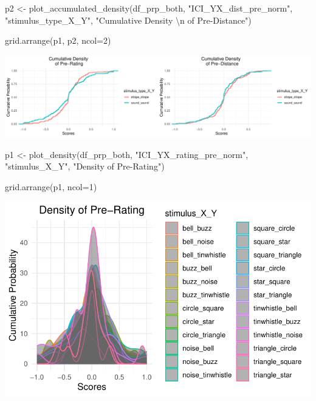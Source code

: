 \documentclass[
  letterpaper,
  DIV=11,
  numbers=noendperiod]{scrartcl}
\newenvironment{Shaded}{\begin{snugshade}}{\end{snugshade}}
\newcommand{\AttributeTok}[1]{\textcolor[rgb]{0.40,0.45,0.13}{#1}}
\newcommand{\DecValTok}[1]{\textcolor[rgb]{0.68,0.00,0.00}{#1}}
\newcommand{\FunctionTok}[1]{\textcolor[rgb]{0.28,0.35,0.67}{#1}}
\newcommand{\NormalTok}[1]{\textcolor[rgb]{0.00,0.23,0.31}{#1}}
\newcommand{\OtherTok}[1]{\textcolor[rgb]{0.00,0.23,0.31}{#1}}
\newcommand{\SpecialCharTok}[1]{\textcolor[rgb]{0.37,0.37,0.37}{#1}}
\newcommand{\StringTok}[1]{\textcolor[rgb]{0.13,0.47,0.30}{#1}}
\begin{document}
\begin{Shaded}
\begin{Highlighting}[]
\NormalTok{p2 }\OtherTok{\textless{}{-}} \FunctionTok{plot\_accumulated\_density}\NormalTok{(df\_prp\_both, }\StringTok{"ICI\_YX\_dist\_pre\_norm"}\NormalTok{, }\StringTok{"stimulus\_type\_X\_Y"}\NormalTok{, }\StringTok{"Cumulative Density }\SpecialCharTok{\textbackslash{}n}\StringTok{ of Pre{-}Distance"}\NormalTok{)}

\FunctionTok{grid.arrange}\NormalTok{(p1, p2, }\AttributeTok{ncol=}\DecValTok{2}\NormalTok{)}
\end{Highlighting}
\end{Shaded}

\includegraphics{index_files/figure-pdf/unnamed-chunk-24-1.pdf}

\begin{Shaded}
\begin{Highlighting}[]
\NormalTok{p1 }\OtherTok{\textless{}{-}} \FunctionTok{plot\_density}\NormalTok{(df\_prp\_both, }\StringTok{"ICI\_YX\_rating\_pre\_norm"}\NormalTok{, }\StringTok{"stimulus\_X\_Y"}\NormalTok{, }\StringTok{"Density of Pre{-}Rating"}\NormalTok{)}

\FunctionTok{grid.arrange}\NormalTok{(p1, }\AttributeTok{ncol=}\DecValTok{1}\NormalTok{)}
\end{Highlighting}
\end{Shaded}

\includegraphics{index_files/figure-pdf/unnamed-chunk-25-1.pdf}
\end{document}
